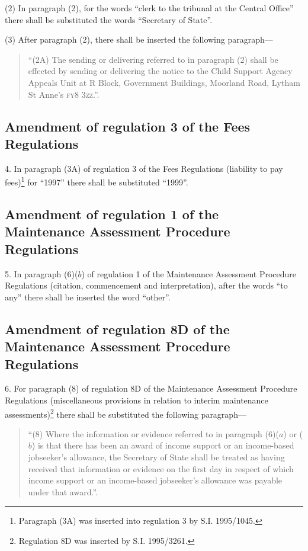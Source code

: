 \documentclass[a4paper]{article}
\begin{document}
(2) In paragraph (2), for the words “clerk to the tribunal at the Central Office” there shall be substituted the words “Secretary of State”.

(3) After paragraph (2), there shall be inserted the following paragraph—
\begin{quotation}
“(2A) The sending or delivering referred to in paragraph (2) shall be effected by sending or delivering the notice to the Child Support Agency Appeals Unit at R Block, Government Buildings, Moorland Road, Lytham St Anne’s \textsc{\lowercase{FY8 3ZZ}}.”.
\end{quotation}

\subsection[4. Amendment of regulation 3 of the Fees Regulations]{Amendment of regulation 3 of the Fees Regulations}

4.  In paragraph (3A) of regulation 3 of the Fees Regulations (liability to pay fees)\footnote{\frenchspacing Paragraph (3A) was inserted into regulation 3 by S.I. 1995/1045.} for “1997” there shall be substituted “1999”.

\subsection[5. Amendment of regulation 1 of the Maintenance Assessment Procedure Regulations]{Amendment of regulation 1 of the Maintenance Assessment Procedure Regulations}

5.  In paragraph (6)($b$) of regulation 1 of the Maintenance Assessment Procedure Regulations (citation, commencement and interpretation), after the words “to any” there shall be inserted the word “other”.

\subsection[6. Amendment of regulation 8D of the Maintenance Assessment Procedure Regulations]{Amendment of regulation 8D of the Maintenance Assessment Procedure Regulations}

6.  For paragraph (8) of regulation 8D of the Maintenance Assessment Procedure Regulations (miscellaneous provisions in relation to interim maintenance assessments)\footnote{\frenchspacing Regulation 8D was inserted by S.I. 1995/3261.} there shall be substituted the following paragraph—
\begin{quotation}
“(8) Where the information or evidence referred to in paragraph (6)($a$) or ($b$) is that there has been an award of income support or an income-based jobseeker’s allowance, the Secretary of State shall be treated as having received that information or evidence on the first day in respect of which income support or an income-based jobseeker’s allowance was payable under that award.”.
\end{quotation}
\end{document}
